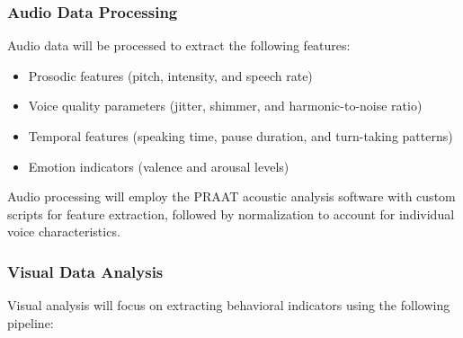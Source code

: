 \subsubsection{Audio Data Processing}
Audio data will be processed to extract the following features:
\begin{itemize}
    \item Prosodic features (pitch, intensity, and speech rate)
    \item Voice quality parameters (jitter, shimmer, and harmonic-to-noise ratio)
    \item Temporal features (speaking time, pause duration, and turn-taking patterns)
    \item Emotion indicators (valence and arousal levels)
\end{itemize}

Audio processing will employ the PRAAT acoustic analysis software with custom scripts for feature extraction, followed by normalization to account for individual voice characteristics.

\subsubsection{Visual Data Analysis}
Visual analysis will focus on extracting behavioral indicators using the following pipeline:

